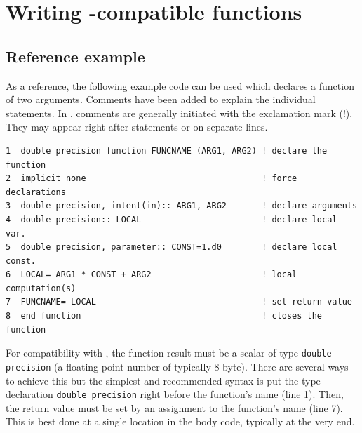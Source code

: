 \documentclass[onecolumn]{article}
\begin{document}


\section{Writing -compatible  functions} \label{sec:fortranFunctions}

\subsection{Reference example}

As a reference, the following example code can be used which declares a function of two arguments. Comments have been added to explain the individual statements. In , comments are generally initiated with the exclamation mark (!). They may appear right after statements or on separate lines.

\begin{shaded}
\begin{small}
\begin{verbatim}
1  double precision function FUNCNAME (ARG1, ARG2) ! declare the function
2  implicit none                                   ! force declarations
3  double precision, intent(in):: ARG1, ARG2       ! declare arguments
4  double precision:: LOCAL                        ! declare local var.
5  double precision, parameter:: CONST=1.d0        ! declare local const.
6  LOCAL= ARG1 * CONST + ARG2                      ! local computation(s)
7  FUNCNAME= LOCAL                                 ! set return value
8  end function                                    ! closes the function
\end{verbatim}
\end{small}
\end{shaded}

For compatibility with , the function result must be a scalar of type \verb|double precision| (a floating point number of typically 8 byte). There are several ways to achieve this but the simplest and recommended syntax is put the type declaration \verb|double precision| right before the function's name (line 1). Then, the return value must be set by an assignment to the function's name (line 7). This is best done at a single location in the body code, typically at the very end.
\end{document}
